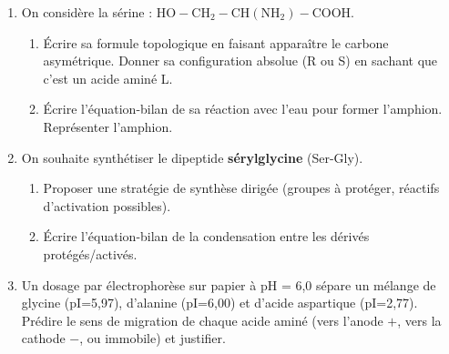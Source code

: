 \documentclass[11pt]{article}
\begin{document}
\begin{exercice}
\begin{enumerate}
\item On considère la sérine : $\mathrm{HO{-}CH_2{-}CH(NH_2){-}COOH}$.
\begin{enumerate}
\item Écrire sa formule topologique en faisant apparaître le carbone asymétrique. Donner sa configuration absolue (R ou S) en sachant que c'est un acide aminé L.
\item Écrire l'équation-bilan de sa réaction avec l'eau pour former l'amphion. Représenter l'amphion.
\end{enumerate}
\item On souhaite synthétiser le dipeptide \textbf{sérylglycine} (Ser-Gly).
\begin{enumerate}
\item Proposer une stratégie de synthèse dirigée (groupes à protéger, réactifs d'activation possibles).
\item Écrire l'équation-bilan de la condensation entre les dérivés protégés/activés.
\end{enumerate}
\item Un dosage par électrophorèse sur papier à pH = 6,0 sépare un mélange de glycine (pI=5,97), d'alanine (pI=6,00) et d'acide aspartique (pI=2,77). Prédire le sens de migration de chaque acide aminé (vers l'anode $+$, vers la cathode $-$, ou immobile) et justifier.
\end{enumerate}
\end{exercice}
\end{document}
